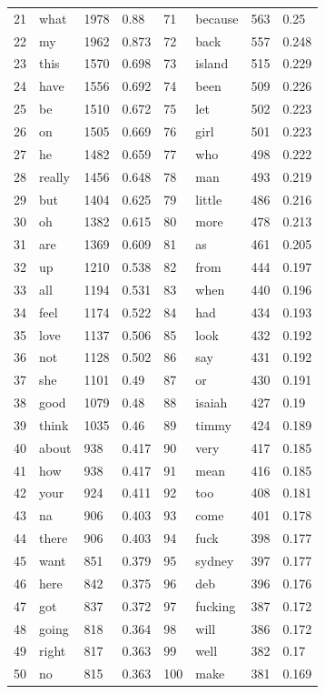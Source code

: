 \documentclass[11pt]{article}
\begin{document}
\begin{center}
\begin{tabular}{llllllll}
21 & what & 1978 & 0.88 & 71 & because & 563 & 0.25 \\
22 & my & 1962 & 0.873 & 72 & back & 557 & 0.248 \\
23 & this & 1570 & 0.698 & 73 & island & 515 & 0.229 \\
24 & have & 1556 & 0.692 & 74 & been & 509 & 0.226 \\
25 & be & 1510 & 0.672 & 75 & let & 502 & 0.223 \\
26 & on & 1505 & 0.669 & 76 & girl & 501 & 0.223 \\
27 & he & 1482 & 0.659 & 77 & who & 498 & 0.222 \\
28 & really & 1456 & 0.648 & 78 & man & 493 & 0.219 \\
29 & but & 1404 & 0.625 & 79 & little & 486 & 0.216 \\
30 & oh & 1382 & 0.615 & 80 & more & 478 & 0.213 \\
31 & are & 1369 & 0.609 & 81 & as & 461 & 0.205 \\
32 & up & 1210 & 0.538 & 82 & from & 444 & 0.197 \\
33 & all & 1194 & 0.531 & 83 & when & 440 & 0.196 \\
34 & feel & 1174 & 0.522 & 84 & had & 434 & 0.193 \\
35 & love & 1137 & 0.506 & 85 & look & 432 & 0.192 \\
36 & not & 1128 & 0.502 & 86 & say & 431 & 0.192 \\
37 & she & 1101 & 0.49 & 87 & or & 430 & 0.191 \\
38 & good & 1079 & 0.48 & 88 & isaiah & 427 & 0.19 \\
39 & think & 1035 & 0.46 & 89 & timmy & 424 & 0.189 \\
40 & about & 938 & 0.417 & 90 & very & 417 & 0.185 \\
41 & how & 938 & 0.417 & 91 & mean & 416 & 0.185 \\
42 & your & 924 & 0.411 & 92 & too & 408 & 0.181 \\
43 & na & 906 & 0.403 & 93 & come & 401 & 0.178 \\
44 & there & 906 & 0.403 & 94 & fuck & 398 & 0.177 \\
45 & want & 851 & 0.379 & 95 & sydney & 397 & 0.177 \\
46 & here & 842 & 0.375 & 96 & deb & 396 & 0.176 \\
47 & got & 837 & 0.372 & 97 & fucking & 387 & 0.172 \\
48 & going & 818 & 0.364 & 98 & will & 386 & 0.172 \\
49 & right & 817 & 0.363 & 99 & well & 382 & 0.17 \\
50 & no & 815 & 0.363 & 100 & make & 381 & 0.169 \\
\bottomrule
\end{tabular}
\end{center}
\end{document}
